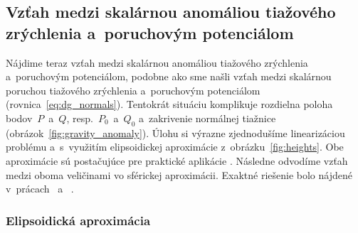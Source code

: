 \documentclass[a4paper, 12pt]{book}
\begin{document}
\subsection{Vzťah medzi skalárnou anomáliou tiažového zrýchlenia a~poruchovým 
potenciálom}

Nájdime teraz vzťah medzi skalárnou anomáliou tiažového zrýchlenia a~poruchovým 
potenciálom, podobne ako sme našli vzťah medzi skalárnou poruchou tiažového 
zrýchlenia a~poruchovým potenciálom (rovnica~\ref{eq:dg_normals}).  Tentokrát 
situáciu komplikuje rozdielna poloha bodov~$P$~a~$Q$, resp.~$P_0$~a~$Q_0$ 
a~zakrivenie normálnej tiažnice (obrázok~\ref{fig:gravity_anomaly}).  Úlohu si 
výrazne zjednodušíme linearizáciou problému a~s~využitím elipsoidickej 
aproximácie z~obrázku~\ref{fig:heights}.  Obe aproximácie sú postačujúce pre 
praktické aplikácie \parencite{MoritzAdvancedGeodesy}.  Následne odvodíme vzťah 
medzi oboma veličinami vo sférickej aproximácii.  Exaktné riešenie bolo nájdené 
v~prácach~\textcite{Meissl1971b} a~\textcite{Borre_chapter8} \parencite[pozri 
tiež napríklad][]{MoritzAdvancedGeodesy,Janak2006}.

\subsubsection{Elipsoidická aproximácia}
\end{document}
